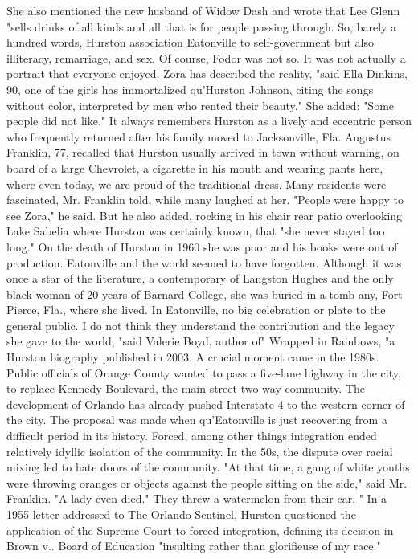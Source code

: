 She also mentioned the new husband of Widow Dash and wrote that Lee Glenn "sells drinks of all kinds and all that is for people passing through.
So, barely a hundred words, Hurston association Eatonville to self-government but also illiteracy, remarriage, and sex.
Of course, Fodor was not so.
It was not actually a portrait that everyone enjoyed.
Zora has described the reality, "said Ella Dinkins, 90, one of the girls has immortalized qu'Hurston Johnson, citing the songs without color, interpreted by men who rented their beauty."
She added: "Some people did not like."
It always remembers Hurston as a lively and eccentric person who frequently returned after his family moved to Jacksonville, Fla.
Augustus Franklin, 77, recalled that Hurston usually arrived in town without warning, on board of a large Chevrolet, a cigarette in his mouth and wearing pants here, where even today, we are proud of the traditional dress.
Many residents were fascinated, Mr. Franklin told, while many laughed at her.
"People were happy to see Zora," he said.
But he also added, rocking in his chair rear patio overlooking Lake Sabelia where Hurston was certainly known, that "she never stayed too long."
On the death of Hurston in 1960 she was poor and his books were out of production.
Eatonville and the world seemed to have forgotten.
Although it was once a star of the literature, a contemporary of Langston Hughes and the only black woman of 20 years of Barnard College, she was buried in a tomb any, Fort Pierce, Fla., where she lived.
In Eatonville, no big celebration or plate to the general public.
I do not think they understand the contribution and the legacy she gave to the world, "said Valerie Boyd, author of" Wrapped in Rainbows, "a Hurston biography published in 2003.
A crucial moment came in the 1980s.
Public officials of Orange County wanted to pass a five-lane highway in the city, to replace Kennedy Boulevard, the main street two-way community.
The development of Orlando has already pushed Interstate 4 to the western corner of the city.
The proposal was made when qu'Eatonville is just recovering from a difficult period in its history.
Forced, among other things integration ended relatively idyllic isolation of the community.
In the 50s, the dispute over racial mixing led to hate doors of the community.
"At that time, a gang of white youths were throwing oranges or objects against the people sitting on the side," said Mr. Franklin.
"A lady even died."
They threw a watermelon from their car. "
In a 1955 letter addressed to The Orlando Sentinel, Hurston questioned the application of the Supreme Court to forced integration, defining its decision in Brown v.. Board of Education "insulting rather than glorifieuse of my race."
